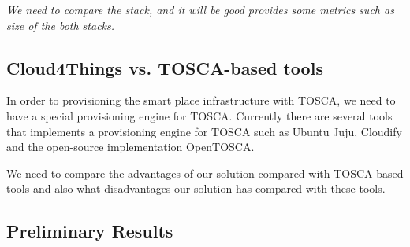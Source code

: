 \textit{We need to compare the stack, and it will be good provides some metrics such as size of the
both stacks.}\\

\subsection{Cloud4Things vs. TOSCA-based tools}
\label{sub:c4t_vs_tosca}

In order to provisioning the smart place infrastructure with TOSCA, we need to have a special
provisioning engine for TOSCA. Currently there are several tools that implements
a provisioning engine for TOSCA such as Ubuntu Juju, Cloudify and the open-source
implementation OpenTOSCA.

We need to compare the advantages of our solution compared with TOSCA-based tools and also
what disadvantages our solution has compared with these tools.

\subsection{Preliminary Results}
\label{sub:preliminary_results}
